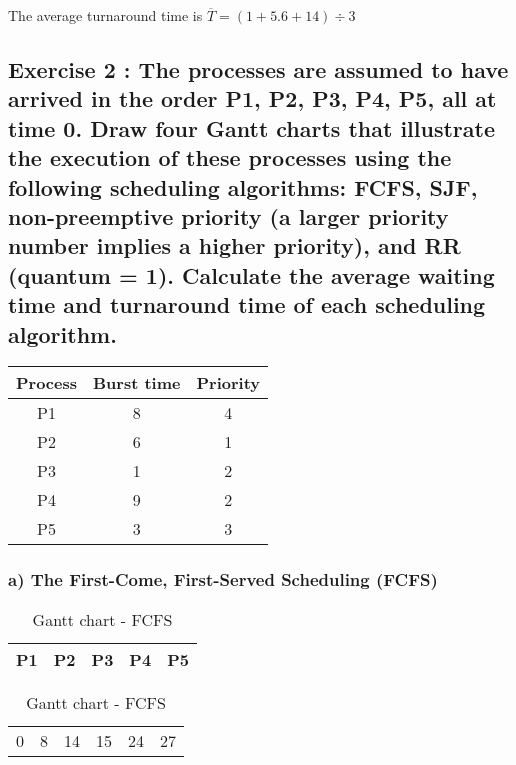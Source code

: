 \documentclass[11pt]{article}
\begin{document}
The average turnaround time is $\overline T = (1 + 5.6 + 14) \div 3 $

\newpage

\subsection*{Exercise 2 : The processes are assumed to have 
arrived in the order P1, P2, P3, P4, P5, all at time 0. Draw 
four Gantt charts that illustrate the execution of these 
processes using the following scheduling algorithms: FCFS, SJF, 
non-preemptive priority (a larger priority number implies a 
higher priority), and RR (quantum = 1). Calculate the average 
waiting time and turnaround time of each scheduling algorithm.}

\begin{table}[!htp]
    \centering            %
    \def\arraystretch{2}  %

    \begin{tabular}{|c||c|c|}
    \hline
    Process & Burst time & Priority \\ \hline
    P1      & 8          & 4        \\ \hline
    P2      & 6          & 1        \\ \hline
    P3      & 1          & 2        \\ \hline
    P4      & 9          & 2        \\ \hline
    P5      & 3          & 3        \\ \hline
    \end{tabular}
\end{table}

\subsubsection*{a) The First-Come, First-Served Scheduling (FCFS)}

\begin{table}[!htp]
    \centering            %
    \def\arraystretch{2}  %
    
    \begin{tabular}{|m{4cm}|m{3cm}|m{0.5cm}|m{4.5cm}|m{1.5cm}|}
        \hline
        P1 & P2 & P3 & P4 & P5 \\
        \hline
    \end{tabular}

    \begin{tabular}{m{4cm} m{3cm} m{0.5cm} m{4.5cm} m{1.5cm} l}
        0 & 8 & 14 & 15 & 24 & 27 \\
    \end{tabular}
    
    \caption{Gantt chart - FCFS}
\end{table}
\end{document}
